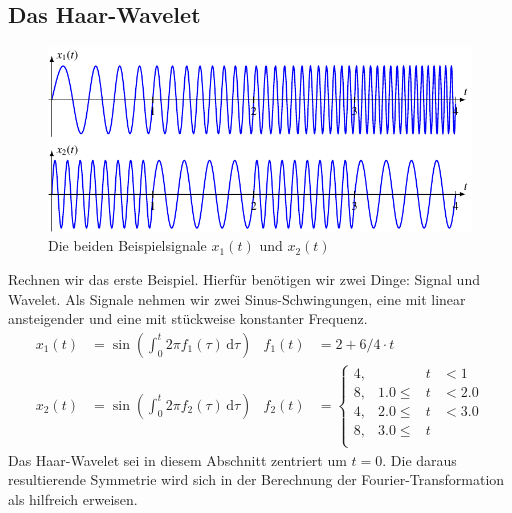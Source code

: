\subsection{Das Haar-Wavelet}
\begin{figure}
	\centering
	\includegraphics{papers/complex/images/signals.pdf}
	\caption{Die beiden Beispielsignale $x_1(t)$ und $x_2(t)$}
\end{figure}
Rechnen wir das erste Beispiel.
Hierfür benötigen wir zwei Dinge: Signal und Wavelet.
Als Signale nehmen wir zwei Sinus-Schwingungen, eine mit linear ansteigender und eine mit stückweise konstanter Frequenz.
\begin{align}
    x_1(t) &= \sin\left( \int_{0}^{t} 2\pi f_1(\tau)\,\mathrm{d}\tau\right) & f_1(t) &= 2 + 6/4 \cdot t \\
    x_2(t) &= \sin\left( \int_{0}^{t} 2\pi f_2(\tau)\,\mathrm{d}\tau\right) & f_2(t) &= \left\lbrace \begin{matrix}
    4, & &t& < 1\\
    8, & 1.0 \le &t& < 2.0\\
    4, & 2.0 \le &t& < 3.0\\
    8, & 3.0 \le &t&\\
    \end{matrix}\right.
\end{align}
Das Haar-Wavelet sei in diesem Abschnitt zentriert um $t=0$.
Die daraus resultierende Symmetrie wird sich in der Berechnung der Fourier-Transformation als hilfreich erweisen.

